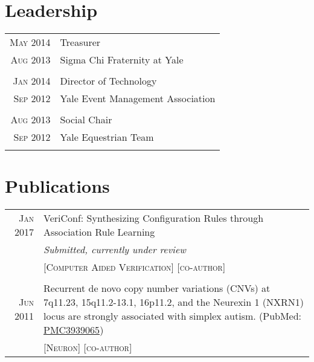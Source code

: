 \documentclass[a4paper,10pt]{article}
\begin{document}
\section{Leadership}
\begin{longtable}{r|p{11cm}}
 \nopagebreak \textsc{May 2014} & Treasurer\\
 \nopagebreak \textsc{Aug 2013} & Sigma Chi Fraternity at Yale \\
 \multicolumn{2}{c}{} \\
 \nopagebreak \textsc{Jan 2014} & Director of Technology\\
 \nopagebreak \textsc{Sep 2012} & Yale Event Management Association \\
 \multicolumn{2}{c}{} \\
 \nopagebreak \textsc{Aug 2013} & Social Chair\\
 \nopagebreak \textsc{Sep 2012} & Yale Equestrian Team \\
 \multicolumn{2}{c}{} \\
\end{longtable}

\section{Publications}
\begin{tabular}{rp{11cm}}
 \textsc{Jan} 2017 & VeriConf: Synthesizing Configuration Rules through Association Rule Learning\\
 								& \small\emph{Submitted, currently under review} \\
 							    & \textsc{[Computer Aided Verification]} \textsc{[co-author]} \\
\multicolumn{2}{c}{} \\
 \textsc{Jun} 2011 & Recurrent de novo copy number variations (CNVs) at 7q11.23, 15q11.2-13.1, 16p11.2, and the Neurexin 1 (NXRN1) locus are strongly associated with simplex autism. (PubMed: \href{https://www.ncbi.nlm.nih.gov/pmc/articles/PMC3939065/}{PMC3939065}) \\
 							   & \textsc{[Neuron]} \textsc{[co-author]} 
\end{tabular}

\end{document}
